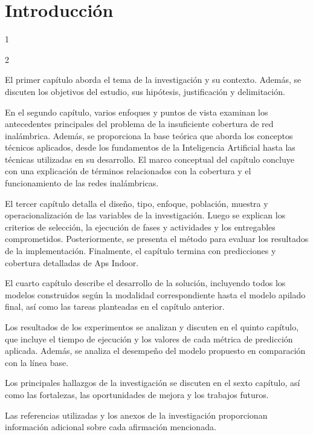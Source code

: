 
\chapter*{Introducción}

1

2

El primer capítulo aborda el tema de la investigación y su contexto. Además, se discuten los objetivos del estudio, sus hipótesis, justificación y delimitación.

En el segundo capítulo, varios enfoques y puntos de vista examinan los antecedentes principales del problema de la insuficiente cobertura de red inalámbrica. Además, se proporciona la base teórica que aborda los conceptos técnicos aplicados, desde los fundamentos de la Inteligencia Artificial hasta las técnicas utilizadas en su desarrollo. El marco conceptual del capítulo concluye con una explicación de términos relacionados con la cobertura y el funcionamiento de las redes inalámbricas.

El tercer capítulo detalla el diseño, tipo, enfoque, población, muestra y operacionalización de las variables de la investigación. Luego se explican los criterios de selección, la ejecución de fases y actividades y los entregables comprometidos. Posteriormente, se presenta el método para evaluar los resultados de la implementación. Finalmente, el capítulo termina con predicciones y cobertura detalladas de Aps Indoor.

El cuarto capítulo describe el desarrollo de la solución, incluyendo todos los modelos construidos según la modalidad correspondiente hasta el modelo apilado final, así como las tareas planteadas en el capítulo anterior.

Los resultados de los experimentos se analizan y discuten en el quinto capítulo, que incluye el tiempo de ejecución y los valores de cada métrica de predicción aplicada. Además, se analiza el desempeño del modelo propuesto en comparación con la línea base.

Los principales hallazgos de la investigación se discuten en el sexto capítulo, así como las fortalezas, las oportunidades de mejora y los trabajos futuros.

Las referencias utilizadas y los anexos de la investigación proporcionan información adicional sobre cada afirmación mencionada.
